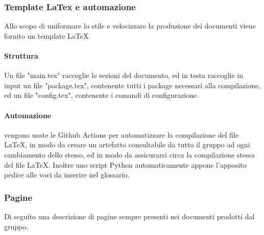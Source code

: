 	    \subsubsection{Template LaTex e automazione}
	    Allo scopo di uniformare lo stile e velocizzare la produzione dei documenti viene fornito un template LaTeX.
	    \paragraph{Struttura}
	    Un file "main.tex" raccoglie le sezioni del documento, ed in testa raccoglie in input un file "package.tex", contenente tutti i package necessari alla compilazione, ed un file "config.tex", contenente i comandi di configurazione.
	    \paragraph{Automazione}
	    vengono usate le Github Actions per automatizzare la compilazione del file LaTeX, in modo da creare un artefatto consultabile da tutto il gruppo ad ogni cambiamento dello stesso, ed in modo  da assicurarsi circa la compilazione stessa del file LaTeX. Inoltre uno script Python automaticamente appone l'apposito pedice alle voci da inserire nel glossario.
	    \subsubsection{Pagine}
	    Di seguito una descrizione di pagine sempre presenti nei documenti prodotti dal gruppo.
